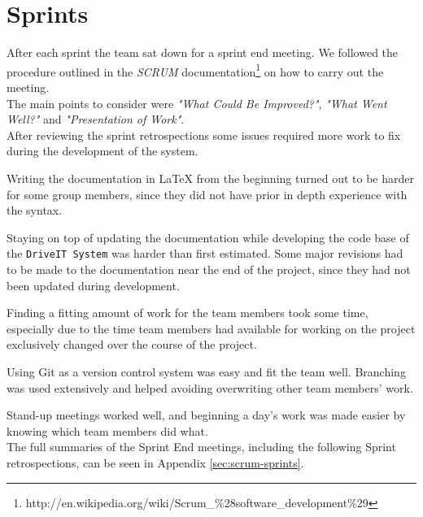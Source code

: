 \section{Sprints}
After each sprint the team sat down for a sprint end meeting. We followed the procedure outlined in the \textit{SCRUM} documentation\footnote{http://en.wikipedia.org/wiki/Scrum\_\%28software\_development\%29} on how to carry out the meeting.\\
The main points to consider were \textit{"What Could Be Improved?"}, \textit{"What Went Well?"} and \textit{"Presentation of Work"}.\\

After reviewing the sprint retrospections some issues required more work to fix during the development of the system.

Writing the documentation in LaTeX from the beginning turned out to be harder for some group members, since they did not have prior in depth experience with the syntax. 

Staying on top of updating the documentation while developing the code base of the \texttt{DriveIT System} was harder than first estimated. Some major revisions had to be made to the documentation near the end of the project, since they had not been updated during development.

Finding a fitting amount of work for the team members took some time, especially due to the time team members had available for working on the project exclusively changed over the course of the project.

Using Git as a version control system was easy and fit the team well. Branching was used extensively and helped avoiding overwriting other team members' work. 

Stand-up meetings worked well, and beginning a day's work was made easier by knowing which team members did what. \\

The full summaries of the Sprint End meetings, including the following Sprint retrospections, can be seen in Appendix \ref{sec:scrum-sprints}.